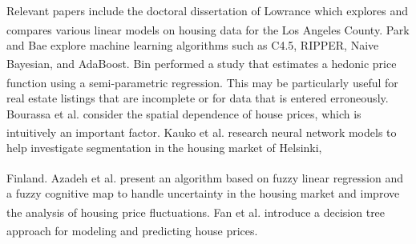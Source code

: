 \documentclass[10pt]{article}
\begin{document}
\begin{multicols}{2}
		Relevant papers include the doctoral dissertation of Lowrance which explores and compares various linear models on housing data for the Los Angeles County.\textsuperscript{\cite{lowrance}} Park and Bae explore machine learning algorithms such as C4.5, RIPPER, Naive Bayesian, and AdaBoost.\textsuperscript{\cite{park}} Bin performed a study that estimates a hedonic price function using a semi-parametric regression.\textsuperscript{\cite{bin}} This may be particularly useful for real estate listings that are incomplete or for data that is entered erroneously. Bourassa et al. consider the spatial dependence of house prices, which is intuitively an important factor.\textsuperscript{\cite{bourassa1}\cite{bourassa2}} Kauko et al. research neural network models to help investigate segmentation in the housing market of Helsinki, 
		
		Finland.\textsuperscript{\cite{kauko}} Azadeh et al. present an algorithm based on fuzzy linear regression and a fuzzy cognitive map to handle uncertainty in the housing market and improve the analysis of housing price fluctuations.\textsuperscript{\cite{azadeh}} Fan et al. introduce a decision tree approach for modeling and predicting house prices.\textsuperscript{\cite{fan}}


\end{multicols}
\end{document}
